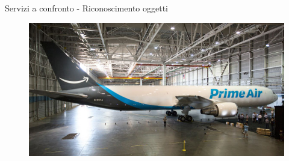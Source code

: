 %
\begin{frame}[t]{Servizi a confronto - Riconoscimento oggetti}
	\begin{figure}[h]
	\centering
		\includegraphics[width=.9\textwidth,keepaspectratio=true]{../../doc/img/prime-air}
		\label{fig:confronto-prime-air}
	\end{figure}
\end{frame}
%
